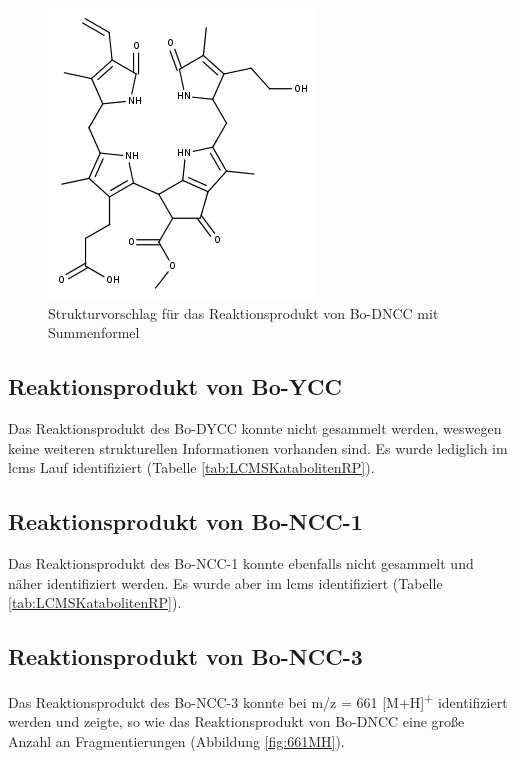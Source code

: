 \begin{figure}[!htbp]
  \centering
  \includegraphics[scale=0.6]{figures/Kapitel7/Kataboliten/fragmentation_structures/VWA_Katabolit_633.png}
  \caption[Strukturvorschlag für das Reaktionsprodukt von Bo-DNCC, Quelle: Autor]{Strukturvorschlag für das Reaktionsprodukt von Bo-DNCC mit Summenformel }
  \label{fig:633MStruktur}
\end{figure}

\pagebreak
\subsection{Reaktionsprodukt von Bo-YCC}

Das Reaktionsprodukt des Bo-DYCC konnte nicht gesammelt werden, weswegen keine weiteren strukturellen Informationen vorhanden sind. Es wurde lediglich im \gls{lcms} Lauf identifiziert (Tabelle \ref{tab:LCMSKatabolitenRP}).

\subsection{Reaktionsprodukt von Bo-NCC-1}

Das Reaktionsprodukt des Bo-NCC-1 konnte ebenfalls nicht gesammelt und näher identifiziert werden. Es wurde aber im \gls{lcms} identifiziert (Tabelle \ref{tab:LCMSKatabolitenRP}).

\pagebreak
\subsection{Reaktionsprodukt von Bo-NCC-3} \label{sec:ESIMSRPBoNCC3}

Das Reaktionsprodukt des Bo-NCC-3 konnte bei m/z = 661 [M+H]\textsuperscript{+} identifiziert werden und zeigte, so wie das Reaktionsprodukt von Bo-DNCC eine große Anzahl an Fragmentierungen (Abbildung \ref{fig:661MH}). 

